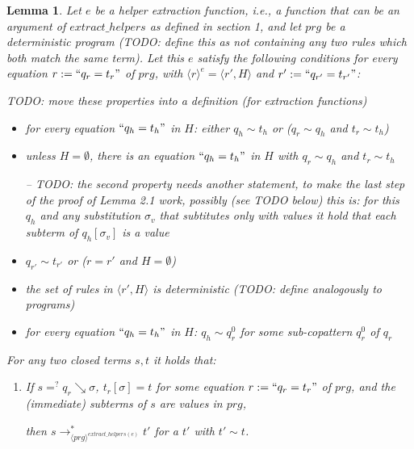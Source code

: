\documentclass[11pt]{article} %
\newtheorem{lemma}{Lemma}
\begin{document}

\begin{lemma}

Let $e$ be a helper extraction function, i.e., a function that can be an argument of $extract\_helpers$ as defined in section 1, and let $prg$ be a deterministic program (TODO: define this as not containing any two rules which both match the same term). Let this $e$ satisfy the following conditions for every equation $r := `` q_r = t_r "$ of $prg$, with $\langle r \rangle^e = \big\langle r', H \big\rangle$ and $r' := `` q_{r'} = t_{r'} "$:

TODO: move these properties into a definition (for extraction functions)

\begin{itemize}
\item for every equation $`` q_h = t_h "$ in $H$: either $q_h \sim t_h$ or ($q_r \sim q_h$ and $t_r \sim t_h$)

\item unless $H = \emptyset$, there is an equation $`` q_h = t_h "$ in $H$ with $q_r \sim q_h$ and $t_r \sim t_h$

-- TODO: the second property needs another statement, to make the last step of the proof of Lemma 2.1 work, possibly (see TODO below) this is: for this $q_h$ and any substitution $\sigma_v$ that subtitutes only with values it hold that each subterm of $q_h[\sigma_v]$ is a value

\item $q_{r'} \sim t_{r'}$ or ($r = r'$ and $H = \emptyset$)

\item the set of rules in $\big\langle r', H \big\rangle$ is deterministic (TODO: define analogously to programs)

\item for every equation $`` q_h = t_h "$ in $H$: $q_h \sim q^0_r$ for some sub-copattern $q^0_r$ of $q_r$
\end{itemize}
For any two closed terms $s,t$ it holds that:

\begin{enumerate}

\item If $s =^? q_r \searrow \sigma$, $t_r[\sigma] = t$ for some equation $r := `` q_r = t_r "$ of $prg$, and the (immediate) subterms of $s$ are values in $prg$,

then $s \longrightarrow^*_{\langle prg \rangle^{extract\_helpers(e)}} t'$ for a $t'$ with $t' \sim t$.


\end{enumerate}
\end{lemma}
\end{document}
